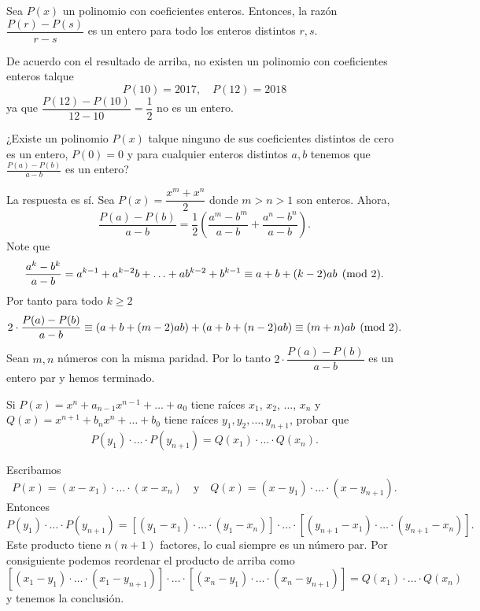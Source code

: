 \begin{theorem}
    Sea $P(x)$ un polinomio con coeficientes enteros.
    Entonces, la razón $\dfrac{P(r) - P(s)}{r - s}$ es un entero para todo los enteros distintos $r, s$.
\end{theorem}

De acuerdo con el resultado de arriba, no existen un polinomio con coeficientes enteros talque
\[
    P(10) = 2017, \quad P(12) = 2018
\]
ya que $\dfrac{P(12) - P(10)}{12 - 10} = \dfrac{1}{2}$ no es un entero.


\begin{example}
    ¿Existe un polinomio $P(x)$ talque ninguno de sus coeficientes distintos de cero es un entero, $P(0) = 0$ y para cualquier enteros distintos $a,b$ tenemos que $\frac{P(a) - P(b)}{a - b}$ es un entero?
\end{example}
\begin{solution}
    La respuesta es sí.
    Sea $P(x) = \dfrac{x^m + x^n}{2}$ donde $m > n > 1$ son enteros.
    Ahora,
    \[
        \frac{P(a) - P(b)}{a - b} = \frac{1}{2} \left(\frac{a^m - b^m}{a - b} + \frac{a^n - b^n}{a - b}\right).
    \]
    Note que
    \[
        \frac{a^k - b^k}{a - b} = a^{k - 1} + a^{k - 2}b + \ldots + ab^{k - 2} + b^{k - 1} \equiv a + b + (k - 2)ab  \pmod{2}.
    \]
    Por tanto para todo $k \geq 2$
    \[
        2 \cdot \frac{P(a) - P(b)}{a - b} \equiv \left(a + b + (m - 2)ab\right) + \left(a + b + (n - 2)ab\right) \equiv (m + n)ab \pmod{2}.
    \]
    Sean $m,n$ números con la misma paridad.
    Por lo tanto $2 \cdot \dfrac{P(a) - P(b)}{a - b}$ es un entero par y hemos terminado.
\end{solution}


\begin{example}
    Si $P(x) = x^n + a_{n - 1} x^{n - 1} + \ldots + a_0$ tiene raíces $x_1$, $x_2$, $\ldots$, $x_n$ y $Q(x) = x^{n + 1} + b_n x^n + \ldots + b_0$ tiene raíces $y_1, y_2, \ldots, y_{n + 1}$, probar que
    \[
        P(y_1) \cdot \ldots \cdot P(y_{n + 1}) = Q(x_1) \cdot \ldots \cdot Q(x_n).
    \]
\end{example}
\begin{solution}
    Escribamos
    \[
        P(x) = (x - x_1) \cdot \ldots \cdot (x - x_n) \quad \text{y} \quad Q(x) = (x - y_1) \cdot \ldots \cdot (x - y_{n + 1}).
    \]
    Entonces
    \[
        P(y_1) \cdot \ldots \cdot P(y_{n + 1}) = \left[ (y_1 - x_1) \cdot \ldots \cdot (y_1 - x_n) \right] \cdot \ldots \cdot \left[ (y_{n + 1} - x_1) \cdot \ldots \cdot (y_{n + 1} - x_n) \right].
    \]
    Este producto tiene $n(n + 1)$ factores, lo cual siempre es un número par.
    Por consiguiente podemos reordenar el producto de arriba como
    \[
        \left[ (x_1 - y_1) \cdot \ldots \cdot (x_1 - y_{n + 1}) \right] \cdot \ldots \cdot \left[ (x_n - y_1) \cdot \ldots \cdot (x_n - y_{n + 1}) \right] =  Q(x_1) \cdot \ldots \cdot Q(x_n)
    \]
    y tenemos la conclusión.
\end{solution}



